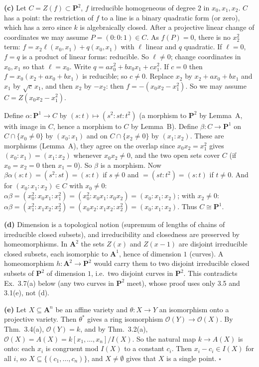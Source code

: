 \documentclass[11pt]{article}
\begin{document}
\textbf{(c)} Let $C=Z(f)\subset\mathbf P^2$, $f$ irreducible homogeneous of degree $2$ in $x_0,x_1,x_2$. $C$ has a point: the restriction of $f$ to a line is a binary quadratic form (or zero), which has a zero since $k$ is algebraically closed. After a projective linear change of coordinates we may assume $P=(0:0:1)\in C$. As $f(P)=0$, there is no $x_2^2$ term: $f=x_2\ell(x_0,x_1)+q(x_0,x_1)$ with $\ell$ linear and $q$ quadratic. If $\ell=0$, $f=q$ is a product of linear forms: reducible. So $\ell\ne0$; change coordinates in $x_0,x_1$ so that $\ell=x_0$. Write $q=ax_0^2+bx_0x_1+cx_1^2$. If $c=0$ then $f=x_0(x_2+ax_0+bx_1)$ is reducible; so $c\ne0$. Replace $x_2$ by $x_2+ax_0+bx_1$ and $x_1$ by $\sqrt c\,x_1$, and then $x_2$ by $-x_2$: then $f=-(x_0x_2-x_1^2)$. So we may assume $C=Z(x_0x_2-x_1^2)$.

Define $\alpha:\mathbf P^1\to C$ by $(s:t)\mapsto(s^2:st:t^2)$ (a morphism to $\mathbf P^2$ by Lemma~A, with image in $C$, hence a morphism to $C$ by Lemma~B). Define $\beta:C\to\mathbf P^1$ on $C\cap\{x_0\ne0\}$ by $(x_0:x_1)$ and on $C\cap\{x_2\ne0\}$ by $(x_1:x_2)$. These are morphisms (Lemma~A), they agree on the overlap since $x_0x_2=x_1^2$ gives $(x_0:x_1)=(x_1:x_2)$ whenever $x_0x_2\neq0$, and the two open sets cover $C$ (if $x_0=x_2=0$ then $x_1=0$). So $\beta$ is a morphism. Now $\beta\alpha(s:t)=(s^2:st)=(s:t)$ if $s\neq0$ and $=(st:t^2)=(s:t)$ if $t\ne0$. And for $(x_0:x_1:x_2)\in C$ with $x_0\neq0$: $\alpha\beta=(x_0^2:x_0x_1:x_1^2)=(x_0^2:x_0x_1:x_0x_2)=(x_0:x_1:x_2)$; with $x_2\neq0$: $\alpha\beta=(x_1^2:x_1x_2:x_2^2)=(x_0x_2:x_1x_2:x_2^2)=(x_0:x_1:x_2)$. Thus $C\cong\mathbf P^1$.

\textbf{(d)} Dimension is a topological notion (supremum of lengths of chains of irreducible closed subsets), and irreducibility and closedness are preserved by homeomorphisms. In $\mathbf A^2$ the sets $Z(x)$ and $Z(x-1)$ are disjoint irreducible closed subsets, each isomorphic to $\mathbf A^1$, hence of dimension $1$ (curves). A homeomorphism $h:\mathbf A^2\to\mathbf P^2$ would carry them to two disjoint irreducible closed subsets of $\mathbf P^2$ of dimension $1$, i.e.\ two disjoint curves in $\mathbf P^2$. This contradicts Ex.~3.7(a) below (any two curves in $\mathbf P^2$ meet), whose proof uses only 3.5 and 3.1(e), not (d).

\textbf{(e)} Let $X\subseteq\mathbf A^n$ be an affine variety and $\theta:X\to Y$ an isomorphism onto a projective variety. Then $\theta^*$ gives a ring isomorphism $\mathcal O(Y)\to\mathcal O(X)$. By Thm.~3.4(a), $\mathcal O(Y)=k$, and by Thm.~3.2(a), $\mathcal O(X)=A(X)=k[x_1,\dots,x_n]/I(X)$. So the natural map $k\to A(X)$ is onto: each $x_i$ is congruent mod $I(X)$ to a constant $c_i$. Then $x_i-c_i\in I(X)$ for all $i$, so $X\subseteq\{(c_1,\dots,c_n)\}$, and $X\ne\emptyset$ gives that $X$ is a single point. \hfill$\square$
\end{document}
